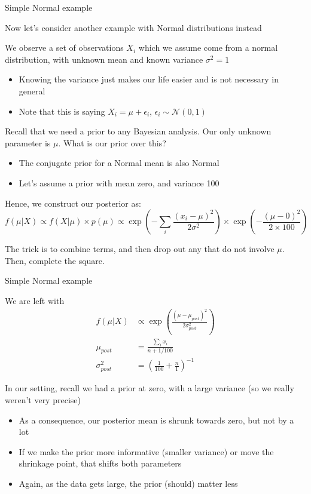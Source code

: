 \documentclass[notes,11pt, aspectratio=169]{beamer}
\newenvironment{wideitemize}{\itemize\addtolength{\itemsep}{10pt}}{\enditemize}
\begin{document}
\begin{frame}{Simple Normal example}
  \begin{wideitemize}
  \item Now let's consider another example with Normal distributions instead
  \item We observe a set of observations $X_{i}$ which we assume come
    from a normal distribution, with unknown mean and known variance
    $\sigma^{2} = 1$
    \begin{itemize}
    \item Knowing the variance just makes our life easier and is not necessary in general
    \item Note that this is saying $X_{i} = \mu + \epsilon_{i}$, $\epsilon_{i} \sim \mathcal{N}(0, 1)$
    \end{itemize}
  \item Recall that we need a prior to any Bayesian analysis. Our only
    unknown parameter is $\mu$. What is our prior over this?
    \begin{itemize}
    \item The conjugate prior for a Normal mean is also Normal
    \item Let's assume a prior with mean zero, and variance 100
    \end{itemize}
  \item Hence, we construct our posterior as:
    $$ f(\mu | X) \propto f(X | \mu) \times p(\mu) \propto  \exp\left(-\sum_{i}\frac{(x_{i} - \mu)^{2}}{2 \sigma^{2}}\right) \times \exp\left(-\frac{(\mu - 0)^{2}}{2 \times 100}\right) $$
  \item The trick is to combine terms, and then drop out any that do
    not involve $\mu$. Then, complete the square.
  \end{wideitemize}
\end{frame}
\begin{frame}{Simple Normal example}
  \begin{wideitemize}
  \item We are left with
    \begin{align*}
      f(\mu | X) &\propto  \exp\left(\frac{(\mu - \mu_{post})^{2}}{2 \sigma_{post}^{2}}\right)\\
      \mu_{post}       &=  \frac{\sum_{i}x_{i}}{n + 1/100}\\
      \sigma^{2}_{post}       &=  \left(\frac{1}{100} + \frac{n}{1}\right)^{-1}
    \end{align*}
  \item In our setting, recall we had a prior at zero, with a large
    variance (so we really weren't very precise)
    \begin{itemize}
    \item As a consequence, our posterior mean is shrunk towards zero,
      but not by a lot
    \item If we make the prior more informative (smaller variance) or
      move the shrinkage point, that shifts both parameters
    \item Again, as the data gets large, the prior (should) matter less
    \end{itemize}
  \end{wideitemize}
  \end{frame}
\end{document}
